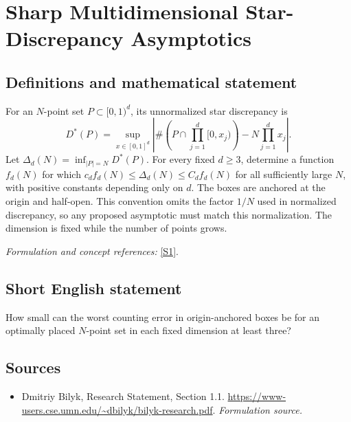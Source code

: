 \documentclass[11pt]{article}
\begin{document}
\section*{\texorpdfstring{Sharp Multidimensional Star-Discrepancy Asymptotics}{Sharp Multidimensional Star-Discrepancy Asymptotics}}\label{statement}
\subsection{Definitions and mathematical statement}
For an $N$-point set $P\subset[0,1)^d$, its unnormalized star discrepancy is
\[
 D^*(P)=\sup_{x\in[0,1]^d}
 \left|\#\left(P\cap\prod_{j=1}^d[0,x_j)\right)-N\prod_{j=1}^dx_j\right|.
\]
Let $\Delta_d(N)=\inf_{|P|=N}D^*(P)$. For every fixed $d\ge3$, determine a function $f_d(N)$ for which $c_df_d(N)\le\Delta_d(N)\le C_df_d(N)$ for all sufficiently large $N$, with positive constants depending only on $d$. The boxes are anchored at the origin and half-open. This convention omits the factor $1/N$ used in normalized discrepancy, so any proposed asymptotic must match this normalization. The dimension is fixed while the number of points grows.
\par\smallskip\textit{Formulation and concept references:} \href{https://www-users.cse.umn.edu/~dbilyk/bilyk-research.pdf}{[S1]}.

\subsection{Short English statement}
How small can the worst counting error in origin-anchored boxes be for an optimally placed $N$-point set in each fixed dimension at least three?
\subsection{Sources}
\begin{itemize}
\item[S1]Dmitriy Bilyk, Research Statement, Section 1.1.
\url{https://www-users.cse.umn.edu/~dbilyk/bilyk-research.pdf}.
\textit{Formulation source.}
\end{itemize}
\end{document}
